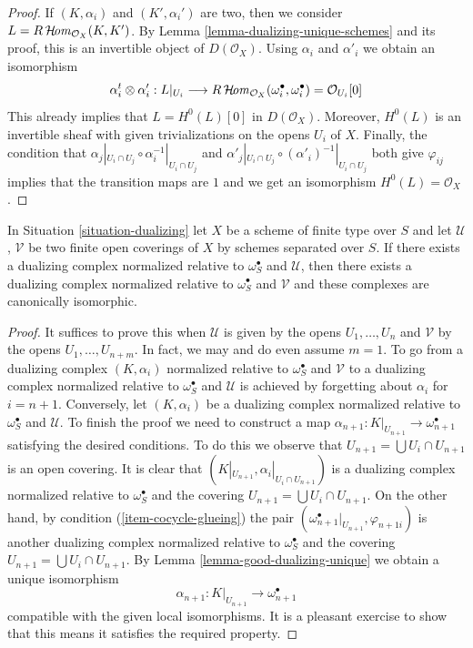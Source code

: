\begin{proof}
If $(K, \alpha_i)$ and $(K', \alpha_i')$ are two, then we consider
$L = R\mathop{\mathcal{H}\!\mathit{om}}\nolimits_{\mathcal{O}_X}(K, K')$.
By Lemma \ref{lemma-dualizing-unique-schemes}
and its proof, this is an invertible object of $D(\mathcal{O}_X)$.
Using $\alpha_i$ and $\alpha'_i$ we obtain an isomorphism
$$
\alpha_i^t \otimes \alpha'_i :
L|_{U_i} \longrightarrow
R\mathop{\mathcal{H}\!\mathit{om}}\nolimits_{\mathcal{O}_X}(\omega_i^\bullet, \omega_i^\bullet) =
\mathcal{O}_{U_i}[0]
$$
This already implies that $L = H^0(L)[0]$ in $D(\mathcal{O}_X)$.
Moreover, $H^0(L)$ is an invertible sheaf with given trivializations
on the opens $U_i$ of $X$. Finally, the condition that
$\alpha_j|_{U_i \cap U_j} \circ \alpha_i^{-1}|_{U_i \cap U_j}$
and
$\alpha'_j|_{U_i \cap U_j} \circ (\alpha'_i)^{-1}|_{U_i \cap U_j}$
both give $\varphi_{ij}$ implies that the transition maps
are $1$ and we get an isomorphism $H^0(L) = \mathcal{O}_X$.
\end{proof}

\begin{lemma}
\label{lemma-good-dualizing-independence-covering}
In Situation \ref{situation-dualizing} let $X$ be a scheme of finite type
over $S$ and let $\mathcal{U}$, $\mathcal{V}$ be two finite open coverings
of $X$ by schemes separated over $S$.
If there exists a dualizing complex normalized
relative to $\omega_S^\bullet$ and $\mathcal{U}$, then
there exists a dualizing complex normalized relative to
$\omega_S^\bullet$ and $\mathcal{V}$ and these complexes are
canonically isomorphic.
\end{lemma}

\begin{proof}
It suffices to prove this when $\mathcal{U}$ is given by the opens
$U_1, \ldots, U_n$ and $\mathcal{V}$ by the opens $U_1, \ldots, U_{n + m}$.
In fact, we may and do even assume $m = 1$.
To go from a dualizing complex $(K, \alpha_i)$ normalized
relative to $\omega_S^\bullet$ and $\mathcal{V}$ to a
dualizing complex normalized relative to $\omega_S^\bullet$ and $\mathcal{U}$
is achieved by forgetting about $\alpha_i$ for $i = n + 1$. Conversely, let
$(K, \alpha_i)$ be a dualizing complex normalized relative to
$\omega_S^\bullet$ and $\mathcal{U}$.
To finish the proof we need to construct a map
$\alpha_{n + 1} : K|_{U_{n + 1}} \to \omega_{n + 1}^\bullet$ satisfying
the desired conditions.
To do this we observe that $U_{n + 1} = \bigcup U_i \cap U_{n + 1}$
is an open covering.
It is clear that $(K|_{U_{n + 1}}, \alpha_i|_{U_i \cap U_{n + 1}})$
is a dualizing complex normalized relative to $\omega_S^\bullet$
and the covering $U_{n + 1} = \bigcup U_i \cap U_{n + 1}$.
On the other hand, by condition (\ref{item-cocycle-glueing}) the pair
$(\omega_{n + 1}^\bullet|_{U_{n + 1}}, \varphi_{n + 1i})$
is another dualizing complex normalized relative to $\omega_S^\bullet$
and the covering
$U_{n + 1} = \bigcup U_i \cap U_{n + 1}$.
By Lemma \ref{lemma-good-dualizing-unique} we obtain a unique isomorphism
$$
\alpha_{n + 1} : K|_{U_{n + 1}} \longrightarrow \omega_{n + 1}^\bullet
$$
compatible with the given local isomorphisms.
It is a pleasant exercise to show that this means it satisfies
the required property.
\end{proof}

